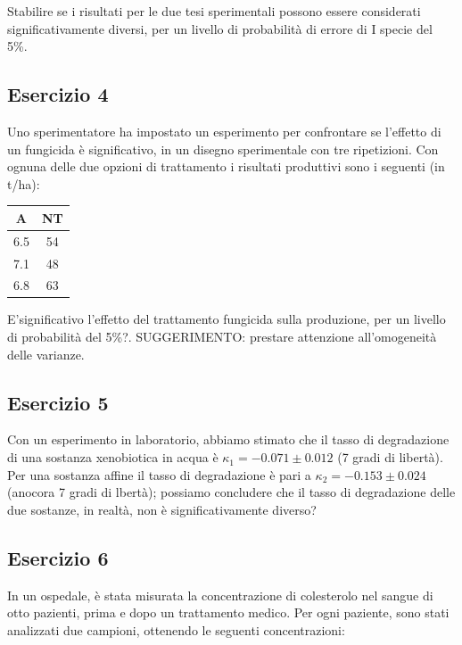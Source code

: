 \documentclass[a4paper,12pt,oneside]{book}
\begin{document}
Stabilire se i risultati per le due tesi sperimentali possono essere considerati significativamente diversi, per un livello di probabilità di errore di I specie del 5\%.

\hypertarget{esercizio-4-4}{%
\subsection{Esercizio 4}\label{esercizio-4-4}}

Uno sperimentatore ha impostato un esperimento per confrontare se l'effetto di un fungicida è significativo, in un disegno sperimentale con tre ripetizioni. Con ognuna delle due opzioni di trattamento i risultati produttivi sono i seguenti (in t/ha):

\begin{longtable}[]{@{}cc@{}}
\toprule()
A & NT \\
\midrule()
\endhead
6.5 & 54 \\
7.1 & 48 \\
6.8 & 63 \\
\bottomrule()
\end{longtable}

E'significativo l'effetto del trattamento fungicida sulla produzione, per un livello di probabilità del 5\%?. SUGGERIMENTO: prestare attenzione all'omogeneità delle varianze.

\hypertarget{esercizio-5-4}{%
\subsection{Esercizio 5}\label{esercizio-5-4}}

Con un esperimento in laboratorio, abbiamo stimato che il tasso di degradazione di una sostanza xenobiotica in acqua è \(\kappa_1 = -0.071 \pm 0.012\) (7 gradi di libertà). Per una sostanza affine il tasso di degradazione è pari a \(\kappa_2 = -0.153 \pm 0.024\) (anocora 7 gradi di lbertà); possiamo concludere che il tasso di degradazione delle due sostanze, in realtà, non è significativamente diverso?

\hypertarget{esercizio-6-2}{%
\subsection{Esercizio 6}\label{esercizio-6-2}}

In un ospedale, è stata misurata la concentrazione di colesterolo nel sangue di otto pazienti, prima e dopo un trattamento medico. Per ogni paziente, sono stati analizzati due campioni, ottenendo le seguenti concentrazioni:
\end{document}
